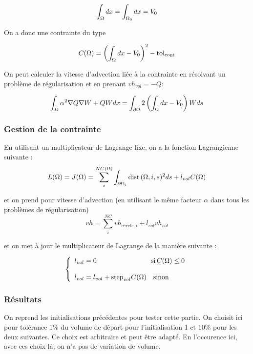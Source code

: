 \documentclass[11pt,a4paper]{article}
\begin{document}
\begin{equation}
\int_{\Omega} dx=\int_{\Omega_{0}}dx=V_0
\end{equation}

On a donc une contrainte du type 

\begin{equation}
C(\Omega)=\left(\int_{\Omega} dx-V_0\right)^2-\textrm{tol}_{\textrm{cont}}
\end{equation}

On peut calculer la vitesse d'advection liée à la contrainte en résolvant un problème de régularisation et en prenant $vh_{vol}=-Q$:

\begin{equation}
\int_D \alpha^2 \nabla Q\nabla W +QWdx=\int_{\partial\Omega} 2\left(\int_{\Omega} dx-V_0\right)Wds
\end{equation}

\subsubsection{Gestion de la contrainte}
En utilisant un multiplicateur de Lagrange fixe, on a la fonction Lagrangienne suivante :
\begin{equation}
L(\Omega)=J(\Omega)=\sum_{i}^{NC(\Omega)}\int_{\partial\Omega_{i}} \textrm{dist}\,(\Omega,i,s)^2ds+l_{vol}C(\Omega)
\end{equation}

et on prend pour vitesse d'advection (en utilisant le même facteur $\alpha$ dans tous les problèmes de régularisation) 
\begin{equation}
vh=\sum_i^{NC}vh_{cercle,i}+l_{vol}vh_{vol}
\end{equation}

et on met à jour le multiplicateur de Lagrange de la manière suivante :

\begin{equation}
\left\{\begin{array}{l}
	l_{vol}=0 \qquad \qquad  \qquad \qquad \textrm{si\,} C(\Omega)\leq 0\\
	\\
	l_{vol}=l_{vol}+\textrm{step}_{vol}C(\Omega) \quad \textrm{sinon}	
	\end{array}\right.
\end{equation}

\subsubsection{Résultats}

On reprend les initialisations précédentes pour tester cette partie.  On choisit ici pour tolérance 1\% du volume de départ pour l'initialisation 1 et 10\% pour les deux suivantes. Ce choix est arbitraire et peut être adapté. En l'occurence ici, avec ces choix là, on n'a pas de variation de volume.
\end{document}
